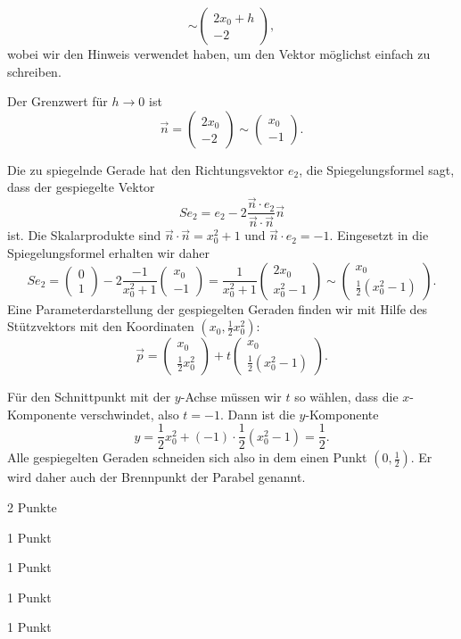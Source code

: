 \begin{loesung}
\begin{teilaufgaben}
\[\sim
\begin{pmatrix}
2x_0+h\\-2
\end{pmatrix},
\]
wobei wir den Hinweis verwendet haben, um den Vektor möglichst einfach zu
schreiben.
\item
Der Grenzwert für $h\to 0$ ist 
\[
\vec{n} = \begin{pmatrix}2x_0\\-2\end{pmatrix}
\sim
\begin{pmatrix}x_0\\-1\end{pmatrix}.
\]
\item
Die zu spiegelnde Gerade hat den Richtungsvektor $e_2$, die Spiegelungsformel
sagt, dass der gespiegelte Vektor
\[
Se_2
=
e_2 - 2\frac{\vec{n}\cdot e_2}{\vec{n}\cdot\vec{n}}\vec{n}
\]
ist.
Die Skalarprodukte sind $\vec{n}\cdot\vec{n}=x_0^2+1$ und $\vec{n}\cdot e_2=-1$.
Eingesetzt in die Spiegelungsformel erhalten wir daher
\[
Se_2
=
\begin{pmatrix}0\\1\end{pmatrix} -2\frac{-1}{x_0^2+1}\begin{pmatrix} x_0\\-1\end{pmatrix}
=
\frac{1}{x_0^2 + 1}\begin{pmatrix}2x_0\\ x_0^2-1 \end{pmatrix}
\sim
\begin{pmatrix}x_0\\\frac12(x_0^2-1)\end{pmatrix}.
\]
Eine Parameterdarstellung der gespiegelten Geraden finden wir mit
Hilfe des Stützvektors mit den Koordinaten $(x_0,\frac12x_0^2)$:
\[
\vec{p}
=
\begin{pmatrix}x_0\\\frac12x_0^2\end{pmatrix}
+
t\begin{pmatrix}x_0\\\frac12(x_0^2-1)\end{pmatrix}.
\]
\item
Für den Schnittpunkt mit der $y$-Achse müssen wir $t$ so wählen, dass
die $x$-Komponente verschwindet, also $t=-1$.
Dann ist die $y$-Komponente
\[
y = \frac12x_0^2 + (-1)\cdot\frac12(x_0^2-1) = \frac12.
\]
Alle gespiegelten Geraden schneiden sich also in dem einen Punkt
$(0,\frac12)$.
Er wird daher auch der Brennpunkt der Parabel genannt.
\qedhere
\end{teilaufgaben}
\end{loesung}


\begin{bewertung}
\begin{teilaufgaben}
\item 2 Punkte
\item 1 Punkt
\item 1 Punkt
\item 1 Punkt
\item 1 Punkt
\end{teilaufgaben}
\end{bewertung}
